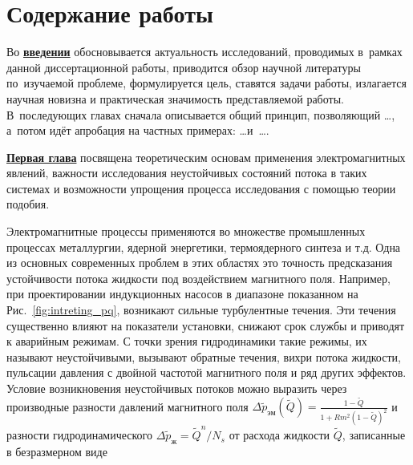 \section*{Содержание работы}
Во \underline{\textbf{введении}} обосновывается актуальность
исследований, проводимых в~рамках данной диссертационной работы,
приводится обзор научной литературы по~изучаемой проблеме,
формулируется цель, ставятся задачи работы, излагается научная новизна
и практическая значимость представляемой работы. В~последующих главах
сначала описывается общий принцип, позволяющий \dots, а~потом идёт
апробация на частных примерах: \dots  и~\dots. 


\underline{\textbf{Первая глава}} посвящена теоретическим основам применения электромагнитных явлений, важности исследования неустойчивых состояний потока в таких системах и возможности упрощения процесса исследования с помощью теории подобия. 

Электромагнитные процессы применяются во множестве промышленных процессах металлургии, ядерной энергетики, термоядерного синтеза и т.д. Одна из основных современных проблем в этих областях это точность предсказания устойчивости потока жидкости под воздействием магнитного поля. Например, при проектировании индукционных насосов в диапазоне показанном на Рис.~\ref{fig:intreting_pq}, возникают сильные турбулентные течения. Эти течения существенно влияют на показатели установки, снижают срок службы и приводят к аварийным режимам. С точки зрения гидродинамики такие режимы, их называют неустойчивыми, вызывают обратные течения, вихри потока жидкости, пульсации давления с двойной частотой магнитного поля и ряд других эффектов. Условие возникновения неустойчивых потоков можно выразить через производные разности давлений магнитного поля $\Delta \widetilde{p}_{эм}(\widetilde{Q}) = \frac{1-\widetilde{Q}}{1+Rm^2 (1-\widetilde{Q} )^2}$  и разности гидродинамического $\Delta \widetilde{p}_{ж} = \widetilde{Q}^n / N_s $ от расхода жидкости $\widetilde{Q}$, записанные в безразмерном виде


